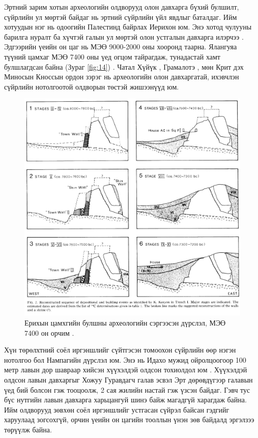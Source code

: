 \documentclass[10pt,twocolumn,letterpaper]{article}
\begin{document}
Эртний зарим хотын археологийн олдворууд олон давхарга бүхий булшилт, сүйрлийн ул мөртэй байдаг нь эртний сүйрлийн үйл явдлыг баталдаг. Ийм хотуудын нэг нь одоогийн Палестинд байрлах Иерихон юм. Энэ хотод чулууны барилга нуралт ба хүчтэй галын ул мөртэй олон устгалын давхарга илэрчээ \cite{96,97}. Эдгээрийн үеийн он цаг нь МЭӨ 9000-2000 оны хооронд таарна. Ялангуяа түүний цамхаг МЭӨ 7400 оны үед огцом тайрагдаж, тунадастай хамт булшлагдсан байна (Зураг \ref{fig:14}) \cite{95}. Чатал Хүйүк \cite{99}, Грамалотэ \cite{98}, мөн Крит дэх Миносын Кноссын ордон \cite{100,101} зэрэг нь археологийн олон давхаргатай, ихэвчлэн сүйрлийн нотолгоотой олдворын төстэй жишээнүүд юм.

\begin{figure}[t]
\begin{center}

   \includegraphics[width=1\linewidth]{jericho.jpg}
\end{center}
   \caption{Ерихын цамхгийн булшны археологийн сэргээсэн дүрслэл, МЭӨ 7400 он орчим \cite{95}.}
\label{fig:14}
\label{fig:onecol}
\end{figure}

Хүн төрөлхтний соёл иргэншлийг сүйтгэсэн томоохон сүйрлийн өөр нэгэн нотолгоо бол Нампагийн дүрслэл юм. Энэ нь Идахо мужид ойролцоогоор 100 метр лавын дор шавраар хийсэн хүүхэлдэй олдсон тохиолдол юм \cite{102,103}. Хүүхэлдэй олдсон лавын давхаргыг Хожуу Гуравдагч галав эсвэл Эрт дөрөвдүгээр галавын үед бий болсон гэж тооцоолж, 2 сая жилийн настай гэж үзсэн байдаг. Гэвч тус бүс нутгийн лавын давхарга харьцангуй шинэ байж магадгүй харагдаж байна. Ийм олдворууд зөвхөн соёл иргэншлийг устгасан сүйрэл байсан гэдгийг харуулаад зогсохгүй, орчин үеийн он цагийн тооллын үнэн зөв байдалд эргэлзээ төрүүлж байна.
\end{document}
